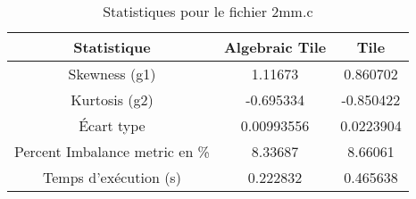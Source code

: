 \documentclass{article}
\begin{document}
\begin{table}[htbp]
  \centering
  \caption{Statistiques pour le fichier 2mm.c}
  \begin{tabular}{|c|c|c|}
    \hline
    Statistique & Algebraic Tile & Tile \\ 
    \hline
    Skewness (g1) & 1.11673 & 0.860702 \\ 
    Kurtosis (g2) & -0.695334 & -0.850422 \\ 
    Écart type & 0.00993556 & 0.0223904 \\ 
    Percent Imbalance metric en \% & 8.33687 & 8.66061 \\ 
    Temps d'exécution (s) &  0.222832 &  0.465638    \\ 
    \hline
  \end{tabular}
\end{table}
\newpage

  
\end{document}
